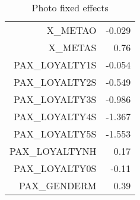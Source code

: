 \documentclass{article}
\begin{document}
\begin{table}[H]
\begin{tabular}{rr}
		X\_METAO	                 &                  -0.029      \\ 
		X\_METAS	                 &                    0.76      \\ 
		PAX\_LOYALTY1S    	 &                 -0.054       \\ 
		PAX\_LOYALTY2S    	 &                 -0.549       \\ 
		PAX\_LOYALTY3S    	 &                 -0.986       \\ 
		PAX\_LOYALTY4S    	 &                 -1.367       \\ 
		PAX\_LOYALTY5S    	 &                 -1.553       \\ 
		PAX\_LOYALTYNH    	 &                 0.17         \\ 
		PAX\_LOYALTY0S	         &         -0.11                \\ 
		PAX\_GENDERM	         &         0.39                 \\ 
		\hline 
		\hline 
	\end{tabular}
	\caption{Photo fixed effects}
\end{table}
\end{document}
